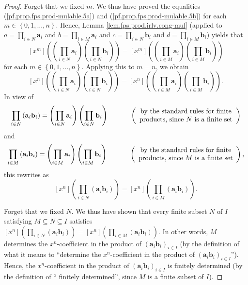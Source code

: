 \begin{fineprint}
\begin{proof}
Forget that we fixed $m$. We thus have proved the equalities
(\ref{pf.prop.fps.prod-mulable.5a}) and (\ref{pf.prop.fps.prod-mulable.5b})
for each $m\in\left\{  0,1,\ldots,n\right\}  $. Hence, Lemma
\ref{lem.fps.prod.irlv.cong-mul} (applied to $a=\prod_{i\in N}\mathbf{a}_{i}$
and $b=\prod_{i\in M}\mathbf{a}_{i}$ and $c=\prod_{i\in N}\mathbf{b}_{i}$ and
$d=\prod_{i\in M}\mathbf{b}_{i}$) yields that%
\[
\left[  x^{m}\right]  \left(  \left(  \prod_{i\in N}\mathbf{a}_{i}\right)
\left(  \prod_{i\in N}\mathbf{b}_{i}\right)  \right)  =\left[  x^{m}\right]
\left(  \left(  \prod_{i\in M}\mathbf{a}_{i}\right)  \left(  \prod_{i\in
M}\mathbf{b}_{i}\right)  \right)
\]
for each $m\in\left\{  0,1,\ldots,n\right\}  $. Applying this to $m=n$, we
obtain%
\[
\left[  x^{n}\right]  \left(  \left(  \prod_{i\in N}\mathbf{a}_{i}\right)
\left(  \prod_{i\in N}\mathbf{b}_{i}\right)  \right)  =\left[  x^{n}\right]
\left(  \left(  \prod_{i\in M}\mathbf{a}_{i}\right)  \left(  \prod_{i\in
M}\mathbf{b}_{i}\right)  \right)  .
\]
In view of
\[
\prod_{i\in N}\left(  \mathbf{a}_{i}\mathbf{b}_{i}\right)  =\left(
\prod_{i\in N}\mathbf{a}_{i}\right)  \left(  \prod_{i\in N}\mathbf{b}%
_{i}\right)  \ \ \ \ \ \ \ \ \ \ \left(
\begin{array}
[c]{c}%
\text{by the standard rules for finite}\\
\text{products, since }N\text{ is a finite set}%
\end{array}
\right)
\]
and%
\[
\prod_{i\in M}\left(  \mathbf{a}_{i}\mathbf{b}_{i}\right)  =\left(
\prod_{i\in M}\mathbf{a}_{i}\right)  \left(  \prod_{i\in M}\mathbf{b}%
_{i}\right)  \ \ \ \ \ \ \ \ \ \ \left(
\begin{array}
[c]{c}%
\text{by the standard rules for finite}\\
\text{products, since }M\text{ is a finite set}%
\end{array}
\right)  ,
\]
this rewrites as%
\[
\left[  x^{n}\right]  \left(  \prod_{i\in N}\left(  \mathbf{a}_{i}%
\mathbf{b}_{i}\right)  \right)  =\left[  x^{n}\right]  \left(  \prod_{i\in
M}\left(  \mathbf{a}_{i}\mathbf{b}_{i}\right)  \right)  .
\]


Forget that we fixed $N$. We thus have shown that every finite subset $N$ of
$I$ satisfying $M\subseteq N\subseteq I$ satisfies $\left[  x^{n}\right]
\left(  \prod_{i\in N}\left(  \mathbf{a}_{i}\mathbf{b}_{i}\right)  \right)
=\left[  x^{n}\right]  \left(  \prod_{i\in M}\left(  \mathbf{a}_{i}%
\mathbf{b}_{i}\right)  \right)  $. In other words, $M$ determines the $x^{n}%
$-coefficient in the product of $\left(  \mathbf{a}_{i}\mathbf{b}_{i}\right)
_{i\in I}$ (by the definition of what it means to \textquotedblleft determine
the $x^{n}$-coefficient in the product of $\left(  \mathbf{a}_{i}%
\mathbf{b}_{i}\right)  _{i\in I}$\textquotedblright). Hence, the $x^{n}%
$-coefficient in the product of $\left(  \mathbf{a}_{i}\mathbf{b}_{i}\right)
_{i\in I}$ is finitely determined (by the definition of \textquotedblleft
finitely determined\textquotedblright, since $M$ is a finite subset of $I$).


\end{proof}
\end{fineprint}
